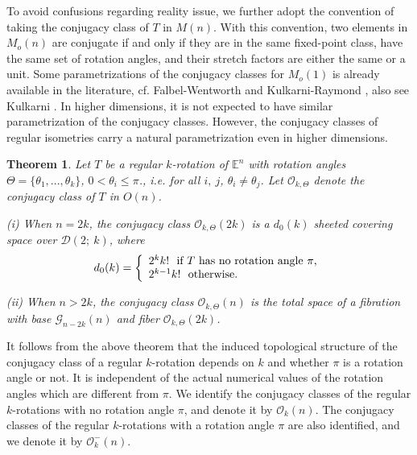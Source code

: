\documentclass[11pt]{amsart}
\newtheorem{theorem}{Theorem}[section]
\theoremstyle{definition}
\theoremstyle{remark}
\numberwithin{equation}{section}
\theoremstyle{plain}
\begin{document}
To avoid confusions regarding reality issue, we further adopt the convention of taking
the conjugacy class of $T$ in $M (n)$. With this convention, two elements in $M_o (n)$ are conjugate if and only if they are in the same fixed-point class, have the same set of rotation angles, and their stretch factors are either the same or a unit.  Some parametrizations of the conjugacy classes for $M_o(1)$ is already available in the literature, cf. Falbel-Wentworth \cite[p-6]{fw} and Kulkarni-Raymond 
\cite[ p-242]{kr}, also
see Kulkarni \cite[p-52]{kulkarni}. In higher dimensions, it is not expected to have similar parametrization of the conjugacy classes. However,  the conjugacy classes of regular isometries carry a natural parametrization  even in higher dimensions. 
\begin{theorem}\label{tcco}
 Let $T$ be a regular $k$-rotation of ${\mathbb E}^n$ with rotation angles $\Theta=\{\theta_1,...,\theta_k\}$, $0 < \theta_i \leq \pi$., i.e.  for all $i, \ j$, $\theta_i \neq \theta_j$. Let ${\mathcal O}_{k, \Theta}$ denote the conjugacy class of $T$ in $O(n)$. 

(i) When $n = 2k$, the conjugacy class ${\mathcal O}_{k, \Theta}(2k)$ is a $d_0(k)$ sheeted covering space over ${\mathcal D}(2; \  k)$, where 
$$d_0(k)= \left \{ \begin{array}{ll} 2^k k! \ \hbox{ if $T$ has no rotation angle $\pi$,}\\
                    2^{k-1}k! \ \hbox{ otherwise.}
                   \end{array}  \right.$$ 

(ii) When $n > 2k$, the conjugacy class ${\mathcal O}_{k, \Theta}(n)$ is the total space of a fibration with base ${\mathcal G}_{n-2k} (n)$ and fiber ${\mathcal O}_{k, \Theta} (2k)$. 
\end{theorem}
It follows from the above theorem that  the induced topological structure of the conjugacy class of a regular $k$-rotation depends on $k$ and whether $\pi$ is a rotation angle or not.  It is independent of the actual numerical values of the rotation angles which are different from $\pi$.  We identify the conjugacy classes of the regular $k$-rotations with  no rotation angle $\pi$, and denote it by ${\mathcal O}_k(n)$. The conjugacy classes of the regular $k$-rotations with a rotation angle $\pi$ are also identified, and we denote it by ${\mathcal O}_k^-(n)$. 
\end{document}
